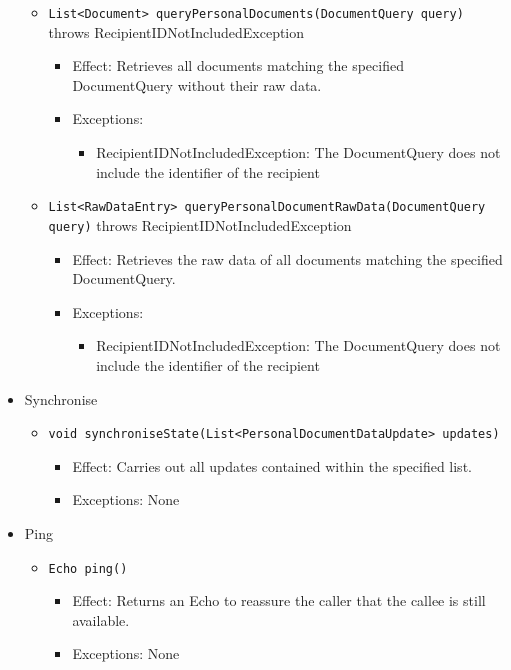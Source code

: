 \documentclass[a4paper,10pt]{article}
\begin{document}
\begin{itemize}
\begin{itemize}
		\item \texttt{List<Document> queryPersonalDocuments(DocumentQuery query)} throws RecipientIDNotIncludedException
		\begin{itemize}
			\item Effect: Retrieves all documents matching the specified DocumentQuery without their raw data.
			\item Exceptions:
			\begin{itemize}
				\item RecipientIDNotIncludedException: The DocumentQuery does not include the identifier of the recipient
			\end{itemize}
		\end{itemize}
		
		\item \texttt{List<RawDataEntry> queryPersonalDocumentRawData(DocumentQuery query)} throws RecipientIDNotIncludedException
		\begin{itemize}
			\item Effect: Retrieves the raw data of all documents matching the specified DocumentQuery.
			\item Exceptions:
			\begin{itemize}
				\item RecipientIDNotIncludedException: The DocumentQuery does not include the identifier of the recipient
			\end{itemize}
		\end{itemize}
	\end{itemize}
	
	\item Synchronise
	\begin{itemize}
		\item \texttt{void synchroniseState(List<PersonalDocumentDataUpdate> updates)}
		\begin{itemize}
			\item Effect: Carries out all updates contained within the specified list.
			\item Exceptions: None
		\end{itemize}
	\end{itemize}
	
	\item Ping
	\begin{itemize}
		\item \texttt{Echo ping()}
		\begin{itemize}
			\item Effect: Returns an Echo to reassure the caller that the callee is still available.
			\item Exceptions: None
		\end{itemize}
	\end{itemize}
\end{itemize}
\end{document}
